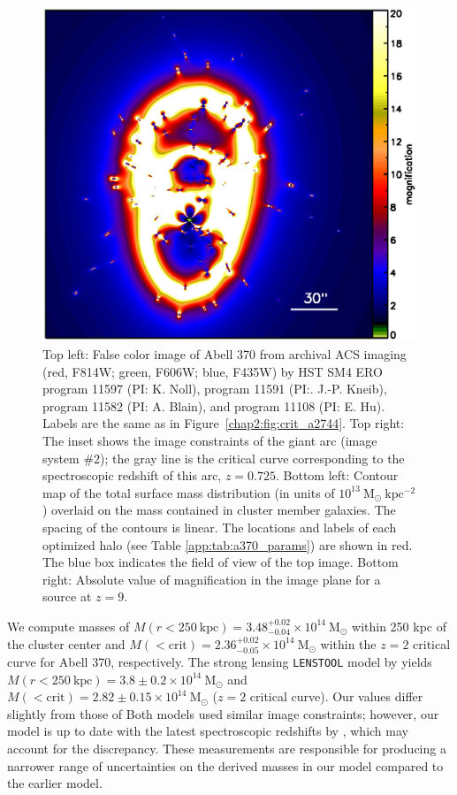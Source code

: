 \begin{figure}[h]
\includegraphics[height=0.28\textheight]{Chap2/c2f6c.eps}
\caption[Abell 370 image constraints and critical curves]{Top left: False color image of Abell 370 from archival ACS imaging (red, F814W; green, F606W; blue, F435W) by HST SM4 ERO program 11597 (PI: K. Noll), program 11591 (PI:. J.-P. Kneib), program 11582 (PI: A. Blain), and program 11108 (PI: E. Hu).  Labels are the same as in Figure~\ref{chap2:fig:crit_a2744}. Top right: The inset shows the image constraints of the giant arc (image system \#2); the gray line is the critical curve corresponding to the spectroscopic redshift of this arc, $z=0.725$. Bottom left: Contour map of the total surface mass distribution (in units of $10^{13}\ \mathrm{M_\odot \ kpc^{-2}}$) overlaid on the mass contained in cluster member galaxies. The spacing of the contours is linear. The locations and labels of each optimized halo (see Table \ref{app:tab:a370_params}) are shown in red. The blue box indicates the field of view of the top image. Bottom right: Absolute value of magnification in the image plane for a source at $z=9$.}
\label{chap2:fig:crit_a370}
\end{figure}

We compute masses of $M(r<250\ \mathrm{kpc})=3.48^{+0.02}_{-0.04}\times10^{14}\ \mathrm{M_\odot}$ within 250 kpc of the cluster center and $M(<\mathrm{crit})=2.36^{+0.02}_{-0.05}\times10^{14}\ \mathrm{M_\odot}$ within the $z=2$ critical curve for Abell 370, respectively. The strong lensing \texttt{LENSTOOL} model by \citet{Richard:2010wd} yields $M(r<250\ \mathrm{kpc})=3.8\pm0.2\times10^{14}\ \mathrm{M_\odot}$ and $M(<\mathrm{crit})=2.82\pm0.15\times10^{14}\ \mathrm{M_\odot}$  ($z=2$ critical curve). Our values differ slightly from those of \citeauthor{Richard:2010wd} Both models used similar image constraints; however, our model is up to date with the latest spectroscopic redshifts by  \citet{Richard:2014gf}, which may account for the discrepancy. These measurements are responsible for producing a narrower range of uncertainties on the derived masses in our model compared to the earlier \citeauthor{Richard:2010wd} model.


